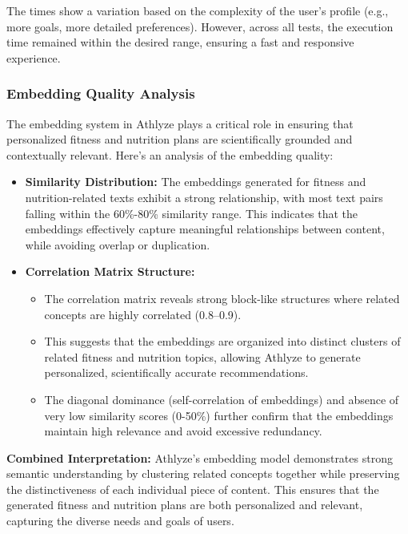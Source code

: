 \documentclass[conference]{IEEEtran}
\begin{document}
The times show a variation based on the complexity of the user's profile (e.g., more goals, more detailed preferences). However, across all tests, the execution time remained within the desired range, ensuring a fast and responsive experience.

\subsubsection{Embedding Quality Analysis}

The embedding system in Athlyze plays a critical role in ensuring that personalized fitness and nutrition plans are scientifically grounded and contextually relevant. Here's an analysis of the embedding quality:

\begin{itemize}
    \item \textbf{Similarity Distribution:} The embeddings generated for fitness and nutrition-related texts exhibit a strong relationship, with most text pairs falling within the 60\%-80\% similarity range. This indicates that the embeddings effectively capture meaningful relationships between content, while avoiding overlap or duplication.
    \item \textbf{Correlation Matrix Structure:} 
    \begin{itemize}
        \item The correlation matrix reveals strong block-like structures where related concepts are highly correlated (0.8–0.9). 
        \item This suggests that the embeddings are organized into distinct clusters of related fitness and nutrition topics, allowing Athlyze to generate personalized, scientifically accurate recommendations.
        \item The diagonal dominance (self-correlation of embeddings) and absence of very low similarity scores (0-50\%) further confirm that the embeddings maintain high relevance and avoid excessive redundancy.
    \end{itemize}
\end{itemize}

\textbf{Combined Interpretation:} Athlyze's embedding model demonstrates strong semantic understanding by clustering related concepts together while preserving the distinctiveness of each individual piece of content. This ensures that the generated fitness and nutrition plans are both personalized and relevant, capturing the diverse needs and goals of users.
\end{document}
